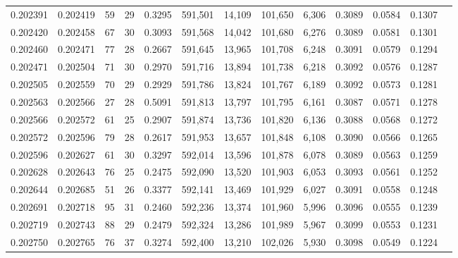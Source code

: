 \begin{tabular}{rrrrrrrrrrrrr}
0.202391 & 0.202419 &    59 &  29 &                                     0.3295 & 591,501 &  14,109 & 101,650 &   6,306 & 0.3089 & 0.0584 & 0.1307 \\
0.202420 & 0.202458 &    67 &  30 &                                     0.3093 & 591,568 &  14,042 & 101,680 &   6,276 & 0.3089 & 0.0581 & 0.1301 \\
0.202460 & 0.202471 &    77 &  28 &                                     0.2667 & 591,645 &  13,965 & 101,708 &   6,248 & 0.3091 & 0.0579 & 0.1294 \\
0.202471 & 0.202504 &    71 &  30 &                                     0.2970 & 591,716 &  13,894 & 101,738 &   6,218 & 0.3092 & 0.0576 & 0.1287 \\
0.202505 & 0.202559 &    70 &  29 &                                     0.2929 & 591,786 &  13,824 & 101,767 &   6,189 & 0.3092 & 0.0573 & 0.1281 \\
0.202563 & 0.202566 &    27 &  28 &                                     0.5091 & 591,813 &  13,797 & 101,795 &   6,161 & 0.3087 & 0.0571 & 0.1278 \\
0.202566 & 0.202572 &    61 &  25 &                                     0.2907 & 591,874 &  13,736 & 101,820 &   6,136 & 0.3088 & 0.0568 & 0.1272 \\
0.202572 & 0.202596 &    79 &  28 &                                     0.2617 & 591,953 &  13,657 & 101,848 &   6,108 & 0.3090 & 0.0566 & 0.1265 \\
0.202596 & 0.202627 &    61 &  30 &                                     0.3297 & 592,014 &  13,596 & 101,878 &   6,078 & 0.3089 & 0.0563 & 0.1259 \\
0.202628 & 0.202643 &    76 &  25 &                                     0.2475 & 592,090 &  13,520 & 101,903 &   6,053 & 0.3093 & 0.0561 & 0.1252 \\
0.202644 & 0.202685 &    51 &  26 &                                     0.3377 & 592,141 &  13,469 & 101,929 &   6,027 & 0.3091 & 0.0558 & 0.1248 \\
0.202691 & 0.202718 &    95 &  31 &                                     0.2460 & 592,236 &  13,374 & 101,960 &   5,996 & 0.3096 & 0.0555 & 0.1239 \\
0.202719 & 0.202743 &    88 &  29 &                                     0.2479 & 592,324 &  13,286 & 101,989 &   5,967 & 0.3099 & 0.0553 & 0.1231 \\
0.202750 & 0.202765 &    76 &  37 &                                     0.3274 & 592,400 &  13,210 & 102,026 &   5,930 & 0.3098 & 0.0549 & 0.1224 \\

\end{tabular}
